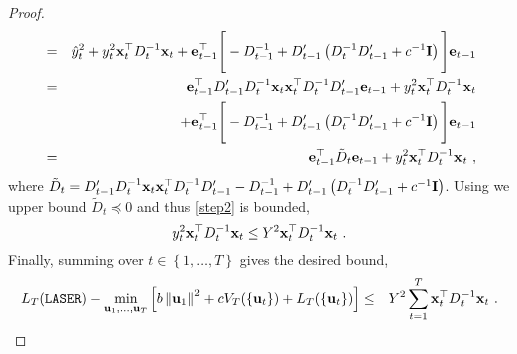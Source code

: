 \begin{proof}
\begin{eqnarray}
& =  &
  \hat{y}_{t}^{2}+y_{t}^{2}{\mathbf{x}}^{\top}_{t}D_{t}^{-1}\mathbf{x}_{t}+\mathbf{e}^{\top}_{t-1}\Bigg[-D_{t-1}^{-1}+D'_{t-1}\left(D_{t}^{-1}D'_{t-1}+c^{-1}\mathbf{I}\right)\Bigg]\mathbf{e}_{t-1}\nonumber\\
& = &
 \mathbf{e}^{\top}_{t-1}D'_{t-1}D_{t}^{-1}\mathbf{x}_{t}{\mathbf{x}}^{\top}_{t}D_{t}^{-1}D'_{t-1}\mathbf{e}_{t-1}+y_{t}^{2}{\mathbf{x}}^{\top}_{t}D_{t}^{-1}\mathbf{x}_{t}\nonumber\\
 &&+\mathbf{e}^{\top}_{t-1}\Bigg[-D_{t-1}^{-1}+D'_{t-1}\left(D_{t}^{-1}D'_{t-1}+c^{-1}\mathbf{I}\right)\Bigg]\mathbf{e}_{t-1}
 \nonumber\\
& = & \mathbf{e}^{\top}_{t-1} \tilde{D}_t \mathbf{e}_{t-1}+y_{t}^{2}{\mathbf{x}}^{\top}_{t}D_{t}^{-1}\mathbf{x}_{t} ~,\label{step2}
\end{eqnarray}
 where $\tilde{D}_t =
 D'_{t-1}D_{t}^{-1}\mathbf{x}_{t}{\mathbf{x}}^{\top}_{t}D_{t}^{-1}D'_{t-1}-D_{t-1}^{-1}+D'_{t-1}\left(D_{t}^{-1}D'_{t-1}+c^{-1}\mathbf{I}\right)$.
Using  we upper bound $\tilde{D}_t
\preceq 0$ and thus \eqref{step2} is bounded,
\[
y_{t}^{2}{\mathbf{x}}^{\top}_{t}D_{t}^{-1}\mathbf{x}_{t} \leq
Y^{2}{\mathbf{x}}^{\top}_{t}D_{t}^{-1}\mathbf{x}_{t} ~.
\]
%
Finally, summing over $t\in\left\{ 1,\ldots,T\right\} $ gives the
desired bound,
\begin{align*}
&L_T(\texttt{LASER})-\min_{\vui{1},\ldots,\vui{T}}\left[b\left\Vert
    \vui{1}\right\Vert ^{2}
+c V_T(\{\vui{t}\})%
+ L_T(\{\vui{t}\})
\right]
\leq&
Y^{2}\sum_{t=1}^{T}\vxti{t}D_{t}^{-1}\vxi{t} ~.
\end{align*}
\QED
\end{proof}

